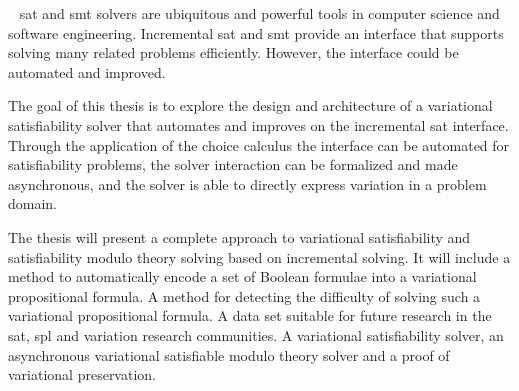~\label{sec:conclusion}
\ac{sat} and \ac{smt} solvers are ubiquitous and powerful tools in computer
science and software engineering. Incremental \ac{sat} and \ac{smt} provide an
interface that supports solving many related problems efficiently. However, the
interface could be automated and improved.

The goal of this thesis is to explore the design and architecture of a
variational satisfiability solver that automates and improves on the incremental
\ac{sat} interface. Through the application of the choice calculus the interface
can be automated for satisfiability problems, the solver interaction can be
formalized and made asynchronous, and the solver is able to directly express
variation in a problem domain.

The thesis will present a complete approach to variational satisfiability and
satisfiability modulo theory solving based on incremental solving. It will
include a method to automatically encode a set of Boolean formulae into a
variational propositional formula. A method for detecting the difficulty of
solving such a variational propositional formula. A data set suitable for future
research in the \ac{sat}, \ac{spl} and variation research communities. A
variational satisfiability solver, an asynchronous variational satisfiable
modulo theory solver and a proof of variational preservation.

